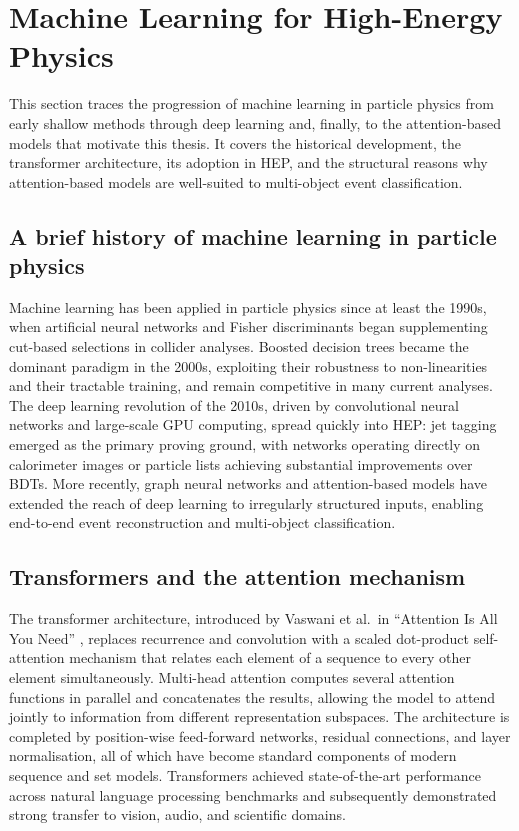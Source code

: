 \section{Machine Learning for High-Energy Physics}
\label{sec:intro_machine_learning_for_hep}

This section traces the progression of machine learning in particle physics from early shallow methods through deep learning and, finally, to the attention-based models that motivate this thesis.
It covers the historical development, the transformer architecture, its adoption in HEP, and the structural reasons why attention-based models are well-suited to multi-object event classification.

\subsection{A brief history of machine learning in particle physics}
\label{subsec:intro_ml_history}

Machine learning has been applied in particle physics since at least the 1990s, when artificial neural networks and Fisher discriminants began supplementing cut-based selections in collider analyses.
Boosted decision trees became the dominant paradigm in the 2000s, exploiting their robustness to non-linearities and their tractable training, and remain competitive in many current analyses.
The deep learning revolution of the 2010s, driven by convolutional neural networks and large-scale GPU computing, spread quickly into HEP: jet tagging emerged as the primary proving ground, with networks operating directly on calorimeter images or particle lists achieving substantial improvements over BDTs.
More recently, graph neural networks and attention-based models have extended the reach of deep learning to irregularly structured inputs, enabling end-to-end event reconstruction and multi-object classification.

\subsection{Transformers and the attention mechanism}
\label{subsec:intro_transformers}

The transformer architecture, introduced by Vaswani et al.\ in ``Attention Is All You Need'' \cite{vaswani2017attention}, replaces recurrence and convolution with a scaled dot-product self-attention mechanism that relates each element of a sequence to every other element simultaneously.
Multi-head attention computes several attention functions in parallel and concatenates the results, allowing the model to attend jointly to information from different representation subspaces.
The architecture is completed by position-wise feed-forward networks, residual connections, and layer normalisation, all of which have become standard components of modern sequence and set models.
Transformers achieved state-of-the-art performance across natural language processing benchmarks and subsequently demonstrated strong transfer to vision, audio, and scientific domains.

